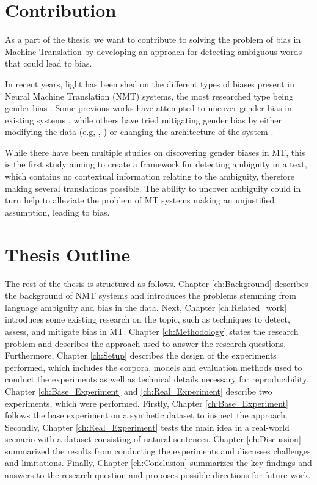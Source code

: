\section{Contribution}
\label{sec:Introduction:Contribution}

As a part of the thesis, we want to contribute to solving the problem of bias in Machine Translation by developing an approach for detecting ambiguous words that could lead to bias. 

In recent years, light has been shed on the different types of biases present in Neural Machine Translation (NMT) systems, the most researched type being gender bias \parencite{Savoldi_2021}. Some previous works have attempted to uncover gender bias in existing systems \parencite{Prates_2019}, while others have tried mitigating gender bias by either modifying the data (e.g, \citet{Escud_Font_2019}, \citet{Stanovsky_2019}) or changing the architecture of the system \parencite{Vanmassenhove_2018}. 

While there have been multiple studies on discovering gender biases in MT, this is the first study aiming to create a framework for detecting ambiguity in a text, which contains no contextual information relating to the ambiguity, therefore making several translations possible. The ability to uncover ambiguity could in turn help to alleviate the problem of MT systems making an unjustified assumption, leading to bias.

\section{Thesis Outline}
\label{sec:Introduction:Outline}
The rest of the thesis is structured as follows. 
Chapter \ref{ch:Background} describes the background of NMT systems and introduces the problems stemming from language ambiguity and bias in the data. 
Next, Chapter \ref{ch:Related_work} introduces some existing research on the topic, such as techniques to detect, assess, and mitigate bias in MT. 
Chapter \ref{ch:Methodology} states the research problem and describes the approach used to answer the research questions. 
Furthermore, Chapter \ref{ch:Setup} describes the design of the experiments performed, which includes the corpora, models and evaluation methods used to conduct the experiments as well as technical details necessary for reproducibility. 
Chapter \ref{ch:Base_Experiment} and \ref{ch:Real_Experiment} describe two experiments, which were performed. Firstly, Chapter \ref{ch:Base_Experiment} follows the base experiment on a synthetic dataset to inspect the approach. Secondly, Chapter \ref{ch:Real_Experiment} tests the main idea in a real-world scenario with a dataset consisting of natural sentences.
Chapter \ref{ch:Discussion} summarized the results from conducting the experiments and discusses challenges and limitations. 
Finally, Chapter \ref{ch:Conclusion} summarizes the key findings and answers to the research question and proposes possible directions for future work.